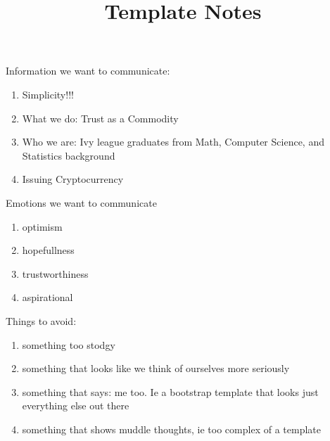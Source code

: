 \title{Template Notes}

Information we want to communicate: 

\begin{enumerate}
	\item Simplicity!!!
	\item What we do: Trust as a Commodity
	\item Who we are: Ivy league graduates from Math, Computer Science, and Statistics background
	\item Issuing Cryptocurrency
\end{enumerate}

Emotions we want to communicate

\begin{enumerate}
	\item optimism
	\item hopefullness
	\item trustworthiness
	\item aspirational
\end{enumerate}


Things to avoid:

\begin{enumerate}
	\item something too stodgy
	\item something that looks like we think of ourselves more seriously
	\item something that says: me too. Ie a bootstrap template that looks just everything else out there
	\item something that shows muddle thoughts, ie too complex of a template
\end{enumerate}



